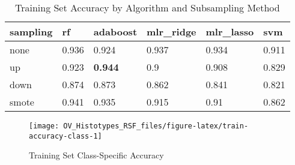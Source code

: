 \documentclass[
]{report}
\begin{document}
\begin{table}

\caption{\label{tab:train-accuracy-table}Training Set Accuracy by Algorithm and Subsampling Method}
\centering
\begin{tabular}[t]{l|l|l|l|l|l}
\hline
sampling & rf & adaboost & mlr\_ridge & mlr\_lasso & svm\\
\hline
none & 0.936 & 0.924 & 0.937 & 0.934 & 0.911\\
\hline
up & 0.923 & \textbf{0.944} & 0.9 & 0.908 & 0.829\\
\hline
down & 0.874 & 0.873 & 0.862 & 0.841 & 0.821\\
\hline
smote & 0.941 & 0.935 & 0.915 & 0.91 & 0.862\\
\hline
\end{tabular}
\end{table}

\begin{figure}[H]

{\centering \texttt{[image: OV\_Histotypes\_RSF\_files/figure-latex/train-accuracy-class-1]} 

}

\caption{Training Set Class-Specific Accuracy}\label{fig:train-accuracy-class}
\end{figure}
\end{document}
